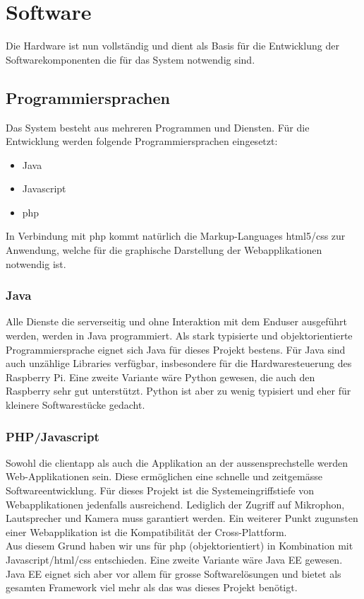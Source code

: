 \section{Software}
\label{sec:chapterexample}
Die Hardware ist nun vollständig und dient als Basis für die Entwicklung der Softwarekomponenten die für das System notwendig sind.
\subsection{Programmiersprachen}
Das System besteht aus mehreren Programmen und Diensten. Für die Entwicklung werden folgende Programmiersprachen eingesetzt:
\begin{itemize}
	\item Java
	\item Javascript
	\item \gls{php}
\end{itemize}
In Verbindung mit \gls{php} kommt natürlich die Markup-Languages \gls{html}5/\gls{css} zur Anwendung, welche für die graphische Darstellung der Webapplikationen notwendig ist.

\subsubsection{Java}
\label{kap:java}
Alle Dienste die serverseitig und ohne Interaktion mit dem Enduser ausgeführt werden, werden in Java programmiert. Als stark typisierte und objektorientierte Programmiersprache eignet sich Java für dieses Projekt bestens. Für Java sind auch unzählige Libraries verfügbar, insbesondere für die Hardwaresteuerung des Raspberry Pi. Eine zweite Variante wäre Python gewesen, die auch den Raspberry sehr gut unterstützt. Python ist aber zu wenig typisiert und eher für kleinere Softwarestücke gedacht.

\subsubsection{PHP/Javascript}
Sowohl die \gls{clientapp} als auch die Applikation an der \gls{aussensprechstelle} werden Web-Applikationen sein. Diese ermöglichen eine schnelle und zeitgemässe Softwareentwicklung. Für dieses Projekt ist die Systemeingriffstiefe von Webapplikationen jedenfalls ausreichend. Lediglich der Zugriff auf Mikrophon, Lautsprecher und Kamera muss garantiert werden. Ein weiterer Punkt zugunsten einer Webapplikation ist die Kompatibilität der Cross-Plattform.
\\
Aus diesem Grund haben wir uns für \gls{php} (objektorientiert) in Kombination mit Javascript/\gls{html}/\gls{css} entschieden. Eine zweite Variante wäre Java EE gewesen. Java EE eignet sich aber vor allem für grosse Softwarelösungen und bietet als gesamten Framework viel mehr als das was dieses Projekt benötigt.
\\
